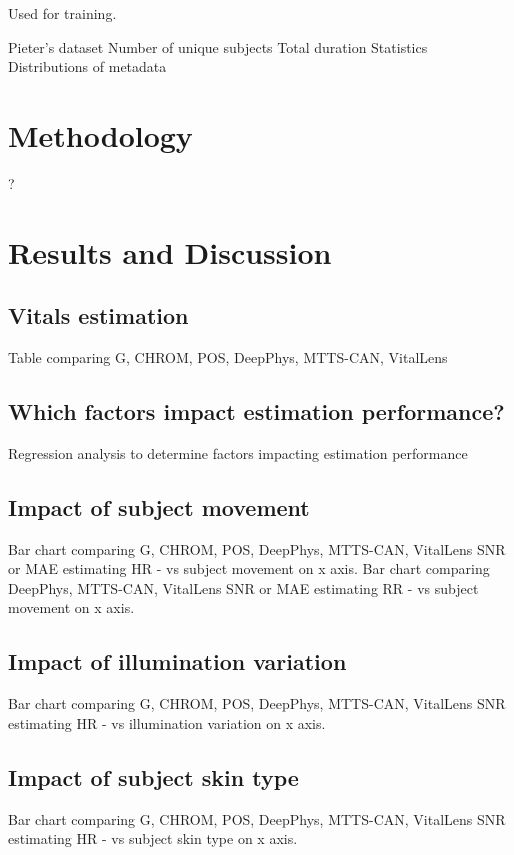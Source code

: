 \documentclass{article}
\begin{document}
Used for training.

Pieter's dataset
Number of unique subjects
Total duration
Statistics
Distributions of metadata


\section{Methodology}
\label{others}

?

\section{Results and Discussion}

\subsection{Vitals estimation}

Table comparing G, CHROM, POS, DeepPhys, MTTS-CAN, VitalLens

\subsection{Which factors impact estimation performance?}

Regression analysis to determine factors impacting estimation performance

\subsection{Impact of subject movement}

Bar chart comparing G, CHROM, POS, DeepPhys, MTTS-CAN, VitalLens SNR or MAE estimating HR - vs subject movement on x axis.
Bar chart comparing DeepPhys, MTTS-CAN, VitalLens SNR or MAE estimating RR - vs subject movement on x axis.

\subsection{Impact of illumination variation}

Bar chart comparing G, CHROM, POS, DeepPhys, MTTS-CAN, VitalLens SNR estimating HR - vs illumination variation on x axis.

\subsection{Impact of subject skin type}

Bar chart comparing G, CHROM, POS, DeepPhys, MTTS-CAN, VitalLens SNR estimating HR - vs subject skin type on x axis.
\end{document}
